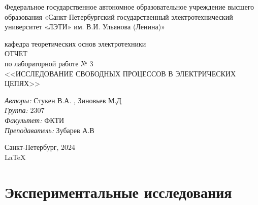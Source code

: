 \documentclass[a4paper,12pt]{report}
\begin{document}
 

\begin{titlepage} 

\begin{center} 

\large Федеральное государственное автономное образовательное учреждение высшего образования «Санкт-Петербургский государственный электротехнический университет «ЛЭТИ» им. В.И. Ульянова (Ленина)»
	
кафедра теоретических основ электротехники\\[5cm] 

\huge ОТЧЕТ\\ по лабораторной работе № 3\\[0.5cm] 
\large <<ИССЛЕДОВАНИЕ СВОБОДНЫХ ПРОЦЕССОВ В ЭЛЕКТРИЧЕСКИХ ЦЕПЯХ>>\\[3.7cm]

\begin{minipage}{1\textwidth} 
    \begin{flushleft} 
        \emph{Авторы:} Стукен В.А. , Зиновьев М.Д\\
        \emph{Группа:} 2307\\
        \emph{Факультет:} ФКТИ\\
        \emph{Преподаватель:} Зубарев А.В
    \end{flushleft} 
\end{minipage} 

\vfill 

Санкт-Петербург, 2024\\
{\large \LaTeX} 

\end{center} 

\thispagestyle{empty} 
\end{titlepage} 

\section*{Экспериментальные исследования}
\end{document}
